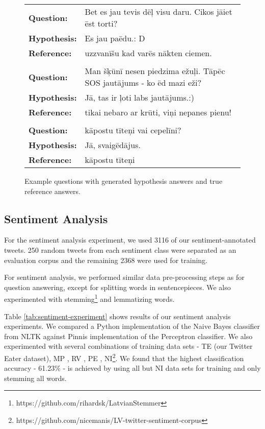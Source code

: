 \documentclass{IOS-Book-Article}
\begin{document}
\begin{figure}[t]
  \begin{tabular}{lp{10.4cm}}
   \bf Question: & Bet es jau tevis dēļ visu daru. Cikos jāiet ēst torti? \\
   \bf Hypothesis: & Es jau paēdu.: D \\
   \bf Reference: & uzzvanīšu kad varēs nākten ciemen. \\ \\
   
   \bf Question: & Man šķūnī nesen piedzima ežuļi. Tāpēc SOS jautājums - ko ēd mazi eži? \\
   \bf Hypothesis: & Jā, tas ir ļoti labs jautājums.:) \\
   \bf Reference: & tikai nebaro ar krūti, viņi nepanes pienu! \\ \\
   
   \bf Question: & kāpostu tīteņi vai cepelīni? \\
   \bf Hypothesis: & Jā, svaigēdājus. \\
   \bf Reference: & kāpostu tīteņi \\
  \end{tabular}
  \caption{Example questions with generated hypothesis answers and true reference answers.}
  \label{fig:qa-examples}
\end{figure}

\subsection{Sentiment Analysis}
\label{sec:sa-exp}

For the sentiment analysis experiment, we used 3116 of our sentiment-annotated tweets. 250 random tweets from each sentiment class were separated as an evaluation corpus and the remaining 2368 were used for training. 

For sentiment analysis, we performed similar data pre-processing steps as for question answering, except for splitting words in sentencepieces. We also experimented with stemming\footnote{https://github.com/rihardsk/LatvianStemmer} and lemmatizing \cite{Paikens:2007:BalticHLT} words.

Table \ref{tab:sentiment-experiment} shows results of our sentiment analysis experiments. We compared a Python implementation of the Naive Bayes classifier from NLTK\cite{bird2009natural} against Pinnis \cite{pinnis2018latvian} implementation of the Perceptron classifier. We also experimented with several combinations of training data sets - TE (our Twitter Eater dataset), MP \cite{pinnis2018latvian}, RV \cite{viksna2018sentiment}, PE \cite{peisenieksuses}, NI\footnote{https://github.com/nicemanis/LV-twitter-sentiment-corpus}. We found that the highest classification accuracy - 61.23\% - is achieved by using all but NI data sets for training and only stemming all words.
\end{document}
